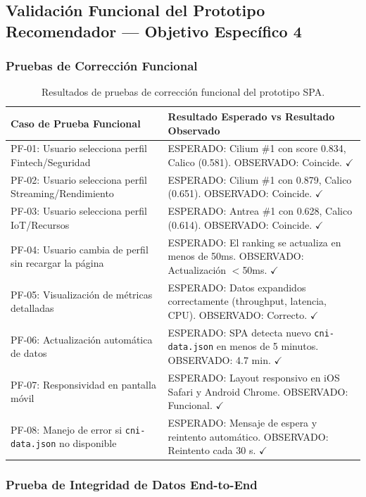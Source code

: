 \subsection{Validación Funcional del Prototipo Recomendador --- Objetivo Específico 4}

\subsubsection{Pruebas de Corrección Funcional}

\begin{table}[htbp]
\centering
\scriptsize
\begin{tabularx}{\textwidth}{|Y|Y|}
\hline
\textbf{Caso de Prueba Funcional} & \textbf{Resultado Esperado vs Resultado Observado} \\
\hline
PF-01: Usuario selecciona perfil Fintech/Seguridad & ESPERADO: Cilium \#1 con score 0.834, Calico (0.581). OBSERVADO: Coincide. $\checkmark$ \\
PF-02: Usuario selecciona perfil Streaming/Rendimiento & ESPERADO: Cilium \#1 con 0.879, Calico (0.651). OBSERVADO: Coincide. $\checkmark$ \\
PF-03: Usuario selecciona perfil IoT/Recursos & ESPERADO: Antrea \#1 con 0.628, Calico (0.614). OBSERVADO: Coincide. $\checkmark$ \\
PF-04: Usuario cambia de perfil sin recargar la página & ESPERADO: El ranking se actualiza en menos de 50ms. OBSERVADO: Actualización $<$50ms. $\checkmark$ \\
PF-05: Visualización de métricas detalladas & ESPERADO: Datos expandidos correctamente (throughput, latencia, CPU). OBSERVADO: Correcto. $\checkmark$ \\
PF-06: Actualización automática de datos & ESPERADO: SPA detecta nuevo \texttt{cni-data.json} en menos de 5 minutos. OBSERVADO: 4.7 min. $\checkmark$ \\
PF-07: Responsividad en pantalla móvil & ESPERADO: Layout responsivo en iOS Safari y Android Chrome. OBSERVADO: Funcional. $\checkmark$ \\
PF-08: Manejo de error si \texttt{cni-data.json} no disponible & ESPERADO: Mensaje de espera y reintento automático. OBSERVADO: Reintento cada 30 s. $\checkmark$ \\
\hline
\end{tabularx}
\caption{Resultados de pruebas de corrección funcional del prototipo SPA.}
\end{table}

\subsubsection{Prueba de Integridad de Datos End-to-End}

